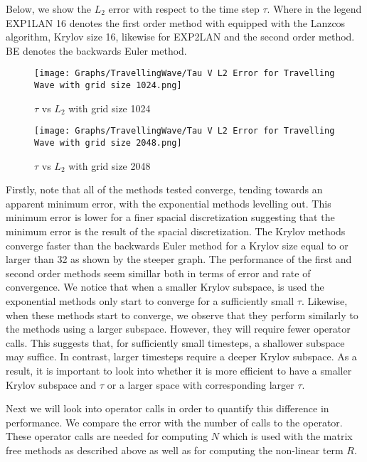 Below, we show the $L_2$ error with respect to the time step $\tau$.
Where in the legend EXP1LAN 16 denotes the first order method with equipped with the Lanzcos algorithm, Krylov size 16, likewise for EXP2LAN and the second order method.
BE denotes the backwards Euler method.

\begin{figure}[H]
    \centering
    \begin{minipage}{0.49\textwidth}
        \texttt{[image: Graphs/TravellingWave/Tau V L2 Error for Travelling Wave with grid size 1024.png]} %
        \caption{$\tau$ vs $L_2$ with grid size 1024}
        \label{fig:plot1}
    \end{minipage}\hfill
    \centering
    \begin{minipage}{0.49\textwidth}
        \texttt{[image: Graphs/TravellingWave/Tau V L2 Error for Travelling Wave with grid size 2048.png]} %
        \caption{$\tau$ vs $L_2$ with grid size 2048}
        \label{fig:plot2}
    \end{minipage}\hfill
\end{figure}

Firstly, note that all of the methods tested converge, tending towards an apparent minimum error, with the exponential methods levelling out.
This minimum error is lower for a finer spacial discretization suggesting that the minimum error is the result of the spacial discretization.
The Krylov methods converge faster than the backwards Euler method for a Krylov size equal to or larger than 32 as shown by the steeper graph.
The performance of the first and second order methods seem simillar both in terms of error and rate of convergence.
We notice that when a smaller Krylov subspace, is used the exponential methods only start to converge for a sufficiently small $\tau$.
Likewise, when these methods start to converge, we observe that they perform similarly to the methods using a larger subspace.
However, they will require fewer operator calls.
This suggests that, for sufficiently small timesteps, a shallower subspace may suffice.
In contrast, larger timesteps require a deeper Krylov subspace.
As a result, it is important to look into whether it is more efficient to have a smaller Krylov subspace and $\tau$ or a larger space with corresponding larger $\tau$.

Next we will look into operator calls in order to quantify this difference in performance.
We compare the error with the number of calls to the operator.
These operator calls are needed for computing $N$ which is used with the matrix free methods as described above as well as for computing the non-linear term $R$.

